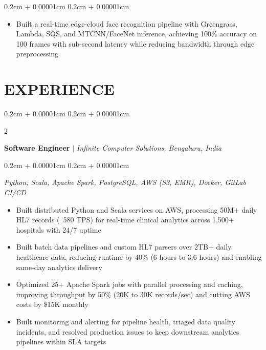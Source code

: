 \documentclass[9pt]{extarticle}
\newenvironment{highlights}{
    \begin{itemize}[
        topsep=0.02cm,
        parsep=0.02cm,
        partopsep=0pt,
        itemsep=0.01cm,
        leftmargin=0.4cm + 10pt
    ]
    \setlength{\itemsep}{0.01cm}
    \renewcommand{\labelitemi}{\textcolor{black}{$\bullet$}}
}{
    \end{itemize}
}
\newenvironment{onecolentry}{
    \begin{adjustwidth}{
        0.2cm + 0.00001cm
    }{
        0.2cm + 0.00001cm
    }
}{
    \end{adjustwidth}
}
\newenvironment{twocolentry}[2][]{
    \onecolentry
    \def\secondColumn{{\fontsize{8.5pt}{10pt}\selectfont #2}}
    \setcolumnwidth{\fill, 4cm}
    \begin{paracol}{2}
}{
    \switchcolumn \raggedleft \secondColumn
    \end{paracol}
    \endonecolentry
}
\begin{document}
    \vspace{0.05cm}

    \begin{onecolentry}
        \begin{highlights}
            \item Built a real-time edge-cloud face recognition pipeline with Greengrass, Lambda, SQS, and MTCNN/FaceNet inference, achieving 100\% accuracy on 100 frames with sub-second latency while reducing bandwidth through edge preprocessing
        \end{highlights}
    \end{onecolentry}

    \section{EXPERIENCE}

    \begin{twocolentry}{
    \textbf{March 2023 - March 2024}}
        \textbf{Software Engineer} $|$ \textit{Infinite Computer Solutions, Bengaluru, India}
    \end{twocolentry}

    \vspace{0.05cm}

    \begin{onecolentry}
        \textit{Python, Scala, Apache Spark, PostgreSQL, AWS (S3, EMR), Docker, GitLab CI/CD}
        \begin{highlights}
            \item Built distributed Python and Scala services on AWS, processing 50M+ daily HL7 records (~580 TPS) for real-time clinical analytics across 1,500+ hospitals with 24/7 uptime
            \item Built batch data pipelines and custom HL7 parsers over 2TB+ daily healthcare data, reducing runtime by 40\% (6 hours to 3.6 hours) and enabling same-day analytics delivery
            \item Optimized 25+ Apache Spark jobs with parallel processing and caching, improving throughput by 50\% (20K to 30K records/sec) and cutting AWS costs by \$15K monthly
            \item Built monitoring and alerting for pipeline health, triaged data quality incidents, and resolved production issues to keep downstream analytics pipelines within SLA targets
        \end{highlights}
    \end{onecolentry}
\end{document}
